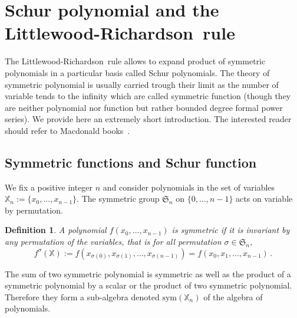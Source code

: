 \documentclass[12pt,a4paper]{article}
\newcommand{\LR}{Littlewood-Richardson\ }
\newcommand{\SG}{{\mathfrak S}}
\newcommand{\sym}{\mathrm{sym}}
\newcommand{\alphX}{{\mathbb X}}
\newtheorem{DEFN}{Definition}
\begin{document}
\section{Schur polynomial and the \LR rule}

The \LR rule allows to expand product of symmetric polynomials in a particular
basis called Schur polynomials. The theory of symmetric polynomial is usually
carried trough their limit as the number of variable tends to the infinity
which are called symmetric function (though they are neither polynomial nor
function but rather bounded degree formal power series). We provide here an
extremely short introduction. The interested reader should refer to Macdonald
books~\cite{Macddo}.

\subsection{Symmetric functions and Schur function}

We fix a positive integer $n$ and consider polynomials in the set of variables
$\alphX_n:=\{x_0,\dots,x_{n-1}\}$. The symmetric group $\SG_n$ on
$\{0,\dots,n-1\}$ acts on variable by permutation.
\begin{DEFN}
 A polynomial $f(x_0,\dots,x_{n-1})$ is symmetric if it is invariant by any
 permutation of the variables, that is for all permutation $\sigma\in\SG_n$,
 \begin{equation}
   f^\sigma(\alphX) := f(x_{\sigma(0)}, x_{\sigma(1)}, \dots, x_{\sigma(n-1)}) = 
   f(x_{0}, x_{1}, \dots, x_{n-1})\,.
 \end{equation}
\end{DEFN}
The sum of two symmetric polynomial is symmetric as well as the product of a
symmetric polynomial by a scalar or the product of two symmetric
polynomial. Therefore they form a sub-algebra denoted $\sym(\alphX_n)$ of the
algebra of polynomials.
\end{document}
